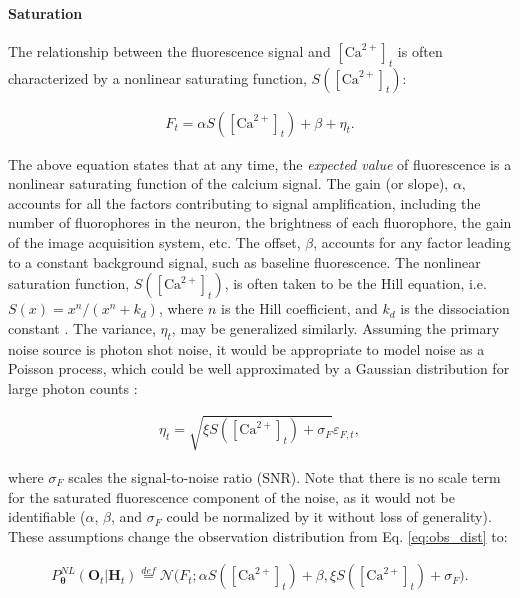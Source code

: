 \documentclass[10pt]{article}
\providecommand{\ve}[1]{\boldsymbol{#1}}
\providecommand{\ve}[1]{\boldsymbol{#1}}
\newcommand{\thetn}{\ve{\theta}}
\newcommand{\p}{P_{\thetn}}
\newcommand{\Ca}{[\text{Ca}^{2+}]}
\begin{document}

\paragraph{Saturation}

The relationship between the fluorescence signal and $\Ca_t$ is often characterized by a nonlinear saturating function, $S(\Ca_t)$:

\begin{align} \label{eq:mean_obs}
F_t = \alpha S(\Ca_t) + \beta + \eta_t.
\end{align} 

\noindent The above equation states that at any time, the \emph{expected value} of fluorescence is a nonlinear saturating function of the calcium signal.  The gain (or slope), $\alpha$, accounts for all the factors contributing to signal amplification, including the number of fluorophores in the neuron, the brightness of each fluorophore, the gain of the image acquisition system, etc.  The offset, $\beta$, accounts for any factor leading to a constant background signal, such as baseline fluorescence. The nonlinear saturation function, $S(\Ca_t)$, is often taken to be the Hill equation, i.e. $S(x)=x^n/(x^n+k_d)$, where $n$ is the Hill coefficient, and $k_d$ is the dissociation constant \cite{YasudaSvoboda04}. The variance, $\eta_t$, may be generalized similarly.  Assuming the primary noise source is photon shot noise, it would be appropriate to model noise as a Poisson process, which could be well approximated by a Gaussian distribution for large photon counts \cite{SjulsonMiesenbock07}:

\begin{align} \label{eq:var_obs}
\eta_t = \sqrt{\xi S(\Ca_t) + \sigma_F} \varepsilon_{F,t},
\end{align} 

\noindent where $\sigma_F$ scales the signal-to-noise ratio (SNR).  Note that there is no scale term for the saturated fluorescence component of the noise, as it would not be identifiable ($\alpha$, $\beta$, and $\sigma_F$ could be normalized by it without loss of generality). These assumptions change the observation distribution from Eq. \ref{eq:obs_dist} to:

\begin{align} \label{eq:nonlin}
\p^{NL}(\ve{O}_t | \ve{H}_t) %
\overset{def}{=} \mathcal{N}\big(F_t; \alpha S(\Ca_t) + \beta, \xi S(\Ca_t)+\sigma_F\big).
\end{align}
\end{document}
